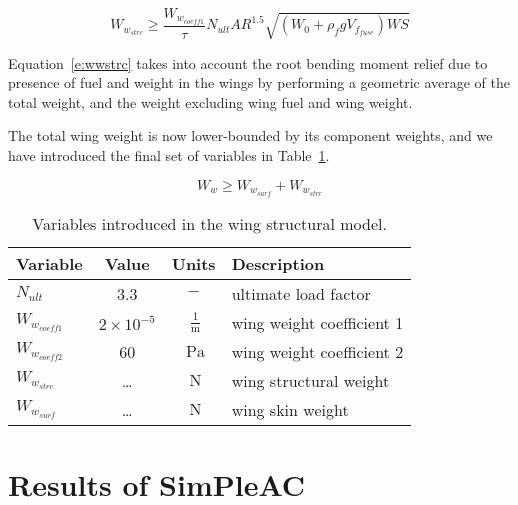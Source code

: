 
\begin{equation} W_{w_{strc}} \geq \frac{W_{w_{coeff1}}}{\tau}
N_{ult} AR ^ {1.5} \sqrt{(W_0+\rho_fgV_{f_{fuse}}) WS} \label{e:wwstrc}
\end{equation}

Equation~\ref{e:wwstrc} takes into account the root
bending moment relief due to presence of fuel and weight in the wings by performing a
geometric average of the total weight, and the weight excluding wing fuel and wing weight.

The total wing weight is now lower-bounded by its component weights, and we have introduced
the final set of variables in Table~\ref{t:vars_wingstrcmodel}.

\begin{equation} W_w \geq W_{w_{surf}} + W_{w_{strc}} \label{e:ww} \end{equation}

\begin{footnotesize}
\begin{table}
    \centering
    \begin{tabular}{ l c c l}
        \toprule
        \textbf{Variable} & \textbf{Value} & \textbf{Units} & \textbf{Description} \\
        \midrule
        $N_{ult}$ & 3.3 & $-$ & ultimate load factor \\
        $W_{w_{coeff1}}$ & $\mathrm{2\times 10^{-5}}$ & $~\mathrm{\tfrac{1}{m}}$ & wing weight coefficient 1 \\
        $W_{w_{coeff2}}$ & 60 & $~\mathrm{Pa}$ & wing weight coefficient 2 \\
        $W_{w_{strc}}$ & \ldots & $~\mathrm{N}$ & wing structural weight \\
        $W_{w_{surf}}$ & \ldots & $~\mathrm{N}$ & wing skin weight \\
    \bottomrule
    \end{tabular}
    \caption{Variables introduced in the wing structural model.}
    \label{t:vars_wingstrcmodel}
\end{table} \end{footnotesize}

\section{Results of SimPleAC}

